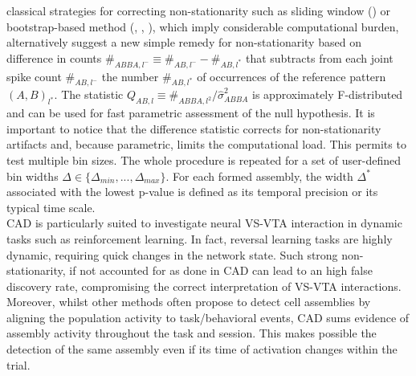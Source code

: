 \begin{framed}
classical strategies for correcting non-stationarity such as sliding window (\cite{Gruen}) or bootstrap-based method (\cite{Fujisawa}, \cite{Pipa}, \cite{Picado}), which imply considerable computational burden,  alternatively suggest a new simple remedy for non-stationarity based on difference in counts $\#_{ABBA,l^-} \equiv \#_{AB,l^-} - \#_{AB,l^*}$ that subtracts from each joint spike count $\#_ {AB,l^-}$ the number $\#_{AB,l^*}$ of occurrences of the reference pattern $(A,B)_{l^*}$. The statistic $Q_{AB,l}\equiv\#_{ABBA,l^2}/\hat{\sigma}_{ABBA}^2$ is approximately F-distributed and can be used for fast parametric assessment of the null hypothesis. It is important to notice that the difference statistic corrects for non-stationarity artifacts and, because parametric, limits the computational load. This permits to test multiple bin sizes. The whole procedure is repeated for a set of user-defined bin widths $\Delta \in \{\Delta_{min},...,\Delta_{max}\}$. For each formed assembly, the width $\Delta^*$ associated with the lowest p-value is defined as its temporal precision or its typical time scale.\\CAD is particularly suited to investigate neural VS-VTA interaction in dynamic tasks such as reinforcement learning. In fact, reversal learning tasks are highly dynamic, requiring quick changes in the network state. Such strong non-stationarity, if not accounted for as done in CAD can lead to an high false discovery rate, compromising the correct interpretation of VS-VTA interactions. Moreover, whilst other methods often propose to detect cell assemblies by aligning the population activity to task/behavioral events, CAD sums evidence of assembly activity throughout the task and session. This makes possible the detection of the same assembly even if its time of activation changes within the trial.
\end{framed}
